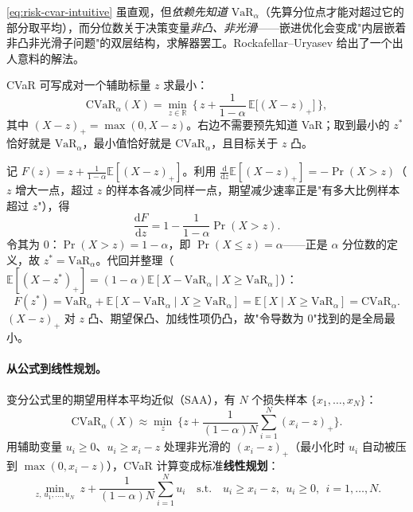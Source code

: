 \cref{eq:risk-cvar-intuitive} 虽直观，但\emph{依赖先知道 $\mathrm{VaR}_\alpha$}（先算分位点才能对超过它的部分取平均），而分位数关于决策变量\emph{非凸、非光滑}——嵌进优化会变成"内层嵌着非凸非光滑子问题"的双层结构，求解器罢工。Rockafellar--Uryasev\cite{rockafellar2000optimization} 给出了一个出人意料的解法。

\begin{theorem}\label{thm:risk-ru}
CVaR 可写成对一个辅助标量 $z$ 求最小：
\begin{equation}
  \mathrm{CVaR}_\alpha(X)=\min_{z\in\mathbb{R}}\ \Big\{\,z+\frac{1}{1-\alpha}\,\mathbb{E}\big[(X-z)_+\big]\,\Big\},
  \label{eq:risk-ru}
\end{equation}
其中 $(X-z)_+=\max(0,X-z)$。右边不需要预先知道 VaR；取到最小的 $z^*$ 恰好就是 $\mathrm{VaR}_\alpha$，最小值恰好就是 $\mathrm{CVaR}_\alpha$，且目标关于 $z$ 凸。
\end{theorem}
\begin{derivation}
记 $F(z)=z+\frac{1}{1-\alpha}\mathbb{E}[(X-z)_+]$。利用 $\frac{\mathrm{d}}{\mathrm{d}z}\mathbb{E}[(X-z)_+]=-\Pr(X>z)$（$z$ 增大一点，超过 $z$ 的样本各减少同样一点，期望减少速率正是"有多大比例样本超过 $z$"），得
\[
  \frac{\mathrm{d}F}{\mathrm{d}z}=1-\frac{1}{1-\alpha}\Pr(X>z).
\]
令其为 0：$\Pr(X>z)=1-\alpha$，即 $\Pr(X\le z)=\alpha$——正是 $\alpha$ 分位数的定义，故 $z^*=\mathrm{VaR}_\alpha$。代回并整理（$\mathbb{E}[(X-z^*)_+]=(1-\alpha)\mathbb{E}[X-\mathrm{VaR}_\alpha\mid X\ge\mathrm{VaR}_\alpha]$）：
\[
  F(z^*)=\mathrm{VaR}_\alpha+\mathbb{E}[X-\mathrm{VaR}_\alpha\mid X\ge\mathrm{VaR}_\alpha]=\mathbb{E}[X\mid X\ge\mathrm{VaR}_\alpha]=\mathrm{CVaR}_\alpha.
\]
$(X-z)_+$ 对 $z$ 凸、期望保凸、加线性项仍凸，故"令导数为 0"找到的是全局最小。
\end{derivation}

\paragraph{从公式到线性规划。}
变分公式里的期望用样本平均近似（SAA），有 $N$ 个损失样本 $\{x_1,\dots,x_N\}$：
\[
  \mathrm{CVaR}_\alpha(X)\approx\min_{z}\ \Big\{z+\frac{1}{(1-\alpha)N}\sum_{i=1}^N(x_i-z)_+\Big\}.
\]
用辅助变量 $u_i\ge0$、$u_i\ge x_i-z$ 处理非光滑的 $(x_i-z)_+$（最小化时 $u_i$ 自动被压到 $\max(0,x_i-z)$），CVaR 计算变成标准\textbf{线性规划}：
\begin{equation}
  \min_{z,\,u_1,\dots,u_N}\ z+\frac{1}{(1-\alpha)N}\sum_{i=1}^N u_i
  \quad\text{s.t.}\quad u_i\ge x_i-z,\ \ u_i\ge0,\ \ i=1,\dots,N.
  \label{eq:risk-cvar-lp}
\end{equation}

